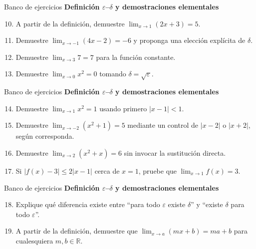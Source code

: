 \documentclass[12pt,aspectratio=169]{beamer}
\newcommand{\R}{\mathbb{R}}
\begin{document}
\begin{frame}[t,allowframebreaks]{Banco de ejercicios}
\small
\noindent \textbf{Definición $\varepsilon$--$\delta$ y demostraciones elementales}\par\smallskip
\begin{enumerate}\setcounter{enumi}{9}
\item A partir de la definición, demuestre $\lim_{x\to1}(2x+3)=5$.
\item Demuestre $\lim_{x\to-1}(4x-2)=-6$ y proponga una elección explícita de $\delta$.
\item Demuestre $\lim_{x\to3}7=7$ para la función constante.
\item Demuestre $\lim_{x\to0}x^2=0$ tomando $\delta=\sqrt{\varepsilon}$.
\end{enumerate}
\end{frame}


\begin{frame}[t,allowframebreaks]{Banco de ejercicios}
\small
\noindent \textbf{Definición $\varepsilon$--$\delta$ y demostraciones elementales}\par\smallskip
\begin{enumerate}\setcounter{enumi}{13}
\item Demuestre $\lim_{x\to1}x^2=1$ usando primero $|x-1|<1$.
\item Demuestre $\lim_{x\to-2}(x^2+1)=5$ mediante un control de $|x-2|$ o $|x+2|$, según corresponda.
\item Demuestre $\lim_{x\to2}(x^2+x)=6$ sin invocar la sustitución directa.
\item Si $|f(x)-3|\le2|x-1|$ cerca de $x=1$, pruebe que $\lim_{x\to1}f(x)=3$.
\end{enumerate}
\end{frame}


\begin{frame}[t,allowframebreaks]{Banco de ejercicios}
\small
\noindent \textbf{Definición $\varepsilon$--$\delta$ y demostraciones elementales}\par\smallskip
\begin{enumerate}\setcounter{enumi}{17}
\item Explique qué diferencia existe entre ``para todo $\varepsilon$ existe $\delta$'' y ``existe $\delta$ para todo $\varepsilon$''.
\item A partir de la definición, demuestre que $\lim_{x\to a}(mx+b)=ma+b$ para cualesquiera $m,b\in\R$.
\end{enumerate}
\end{frame}
\end{document}
